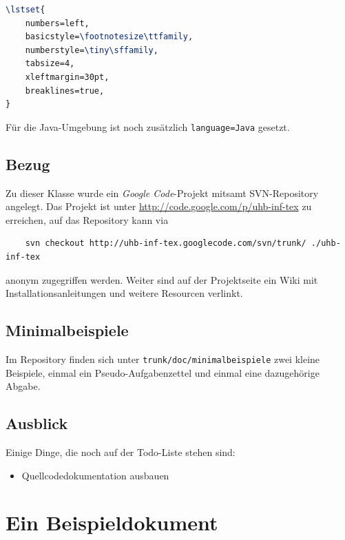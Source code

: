 \documentclass[palatino,gruppe-aus,semester-aus,veranstaltung-aus,abgabe-aus,tutor-aus,utf]{uhb-inf}
\begin{document}
\begin{lstlisting}[language=tex]
\lstset{
	numbers=left,
	basicstyle=\footnotesize\ttfamily,
	numberstyle=\tiny\sffamily,
	tabsize=4,
	xleftmargin=30pt,
	breaklines=true,
}
\end{lstlisting}

Für die Java-Umgebung ist noch zusätzlich \texttt{language=Java} gesetzt.

\subsection{Bezug}

Zu dieser Klasse wurde ein \textit{Google Code}-Projekt mitsamt SVN-Repository angelegt. Das Projekt ist unter \url{http://code.google.com/p/uhb-inf-tex} zu erreichen, auf das Repository kann via

\begin{verbatim}
    svn checkout http://uhb-inf-tex.googlecode.com/svn/trunk/ ./uhb-inf-tex
\end{verbatim}

anonym zugegriffen werden. Weiter sind auf der Projektseite ein Wiki mit Installationsanleitungen und weitere Resourcen verlinkt.

\subsection{Minimalbeispiele}

Im Repository finden sich unter \texttt{trunk/doc/minimalbeispiele} zwei kleine Beispiele, einmal ein Pseudo-Aufgabenzettel und einmal eine dazugehörige Abgabe.

\subsection{Ausblick}

Einige Dinge, die noch auf der Todo-Liste stehen sind:

\begin{itemize}
	\item Quellcodedokumentation ausbauen
\end{itemize}

\section{Ein Beispieldokument}
\end{document}
